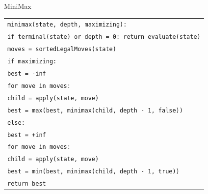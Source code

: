 \documentclass[fullscreen=true,russian,compress,%
    hyperref={unicode,bookmarks=false}]{presentation}
\begin{document}
\begin{frame}{MiniMax}
\begin{block}{}
\scriptsize
\begin{tabular}{@{}l@{}}
\texttt{minimax(state, depth, maximizing):} \\
\quad \texttt{if terminal(state) or depth = 0: return evaluate(state)} \\
\quad \texttt{moves = sortedLegalMoves(state)} \\
\quad \texttt{if maximizing:} \\
\quad\quad \texttt{best = -inf} \\
\quad\quad \texttt{for move in moves:} \\
\quad\quad\quad \texttt{child = apply(state, move)} \\
\quad\quad\quad \texttt{best = max(best, minimax(child, depth - 1, false))} \\
\quad \texttt{else:} \\
\quad\quad \texttt{best = +inf} \\
\quad\quad \texttt{for move in moves:} \\
\quad\quad\quad \texttt{child = apply(state, move)} \\
\quad\quad\quad \texttt{best = min(best, minimax(child, depth - 1, true))} \\
\quad \texttt{return best}
\end{tabular}
\end{block}
\end{frame}
\end{document}
